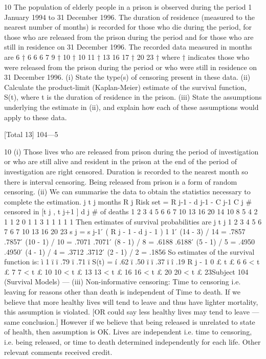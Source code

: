 10
The population of elderly people in a prison is observed during the period
1 January 1994 to 31 December 1996. The duration of residence (measured to
the nearest number of months) is recorded for those who die during the
period, for those who are released from the prison during the period and for
those who are still in residence on 31 December 1996.
The recorded data measured in months are
6 † 6 6 6 7 9 †
10 † 10 11 † 13 16 17 †
20 23 †
where † indicates those who were released from the prison during the period
or who were still in residence on 31 December 1996.
(i) State the type(s) of censoring present in these data.
(ii) Calculate the product-limit (Kaplan-Meier) estimate of the survival
function, S(t), where t is the duration of residence in the prison.
(iii) State the assumptions underlying the estimate in (ii), and explain how
each of these assumptions would apply to these data.

[Total 13]
104—5

\newpage


10
(i)
Those lives who are released from prison during the period of
investigation or who are still alive and resident in the prison at the end of
the period of investigation are right censored.
Duration is recorded to the nearest month so there is interval censoring.
Being released from prison is a form of random censoring.
(ii)
We can summarise the data to obtain the statistics necessary to complete
the estimation.
j t j
months R j
Risk set
= R j-1 - d j-1 - C j-1 C j
# censored
in [t j , t j+1 ] d j
# of deaths
1
2
3
4
5
6 6
7
10
13
16
20 14
10
8
5
4
2 1
1
2
0
1
1 3
1
1
1
1
1
Then estimates of survival probabilities are
j t j
1
2
3
4
5
6
7 6
7
10
13
16
20
23
s j = s j-1  ́
( R j - 1 - d j - 1 )
1
1  ́ (14 - 3) / 14
= .7857
.7857  ́ (10 - 1) / 10 = .7071
.7071  ́ (8 - 1) / 8 = .6188
.6188  ́ (5 - 1) / 5 = .4950
.4950  ́ (4 - 1) / 4 = .3712
.3712  ́ (2 - 1) / 2 = .1856
So estimates of the survival function is:
ì 1
ï
ï .79
ï .71
ï
S(t) = í .62
ï .50
ï
ï .37
ï
î .19
R j - 1
0 £ t £ 6
6 < t £ 7
7 < t £ 10
10 < t £ 13
13 < t £ 16
16 < t £ 20
20 < t £ 23Subject 104 (Survival Models) — %
(iii)
Non-informative censoring: Time to censoring i.e. leaving for reasons
other than death is independent of Time to death.
If we believe that more healthy lives will tend to leave and thus
have lighter mortality, this assumption is violated. [OR could say
less healthy lives may tend to leave — same conclusion.]
However if we believe that being released is unrelated to state of
health, then assumption is OK.
Lives are independent i.e. time to censoring, i.e. being released, or time to
death determined independently for each life.
Other relevant comments received credit.
